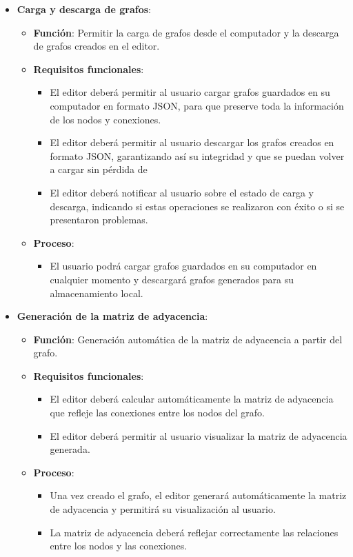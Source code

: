 \documentclass[stu, 12pt, letterpaper, donotrepeattitle, floatsintext, natbib]{apa7}
\begin{document}
\begin{itemize}
    \item \textbf{Carga y descarga de grafos}:
    \begin{itemize}
        \item \textbf{Función}: Permitir la carga de grafos desde el computador y la descarga de grafos creados en el editor.
        \item \textbf{Requisitos funcionales}:
            \begin{itemize}
                \item El editor deberá permitir al usuario cargar grafos guardados en su computador en formato JSON, para que preserve toda la información de los nodos y conexiones.
                \item El editor deberá permitir al usuario descargar los grafos creados en formato JSON, garantizando así su integridad y que se puedan volver a cargar sin pérdida de 
                \item El editor deberá notificar al usuario sobre el estado de carga y descarga, indicando si estas operaciones se realizaron con éxito o si se presentaron problemas.
            \end{itemize}
        \item \textbf{Proceso}:
            \begin{itemize}
                \item El usuario podrá cargar grafos guardados en su computador en cualquier momento y descargará grafos generados para su almacenamiento local.
            \end{itemize}
    \end{itemize}


    \item \textbf{Generación de la matriz de adyacencia}:
    \begin{itemize}
        \item \textbf{Función}: Generación automática de la matriz de adyacencia a partir del grafo.
        \item \textbf{Requisitos funcionales}:
            \begin{itemize}
                \item El editor deberá calcular automáticamente la matriz de adyacencia que refleje las conexiones entre los nodos del grafo.
                \item El editor deberá permitir al usuario visualizar la matriz de adyacencia generada.
            \end{itemize}
        \item \textbf{Proceso}:
            \begin{itemize}
                \item Una vez creado el grafo, el editor generará automáticamente la matriz de adyacencia y permitirá su visualización al usuario.
                \item La matriz de adyacencia deberá reflejar correctamente las relaciones entre los nodos y las conexiones.
            \end{itemize}
    \end{itemize}


\end{itemize}
\end{document}
